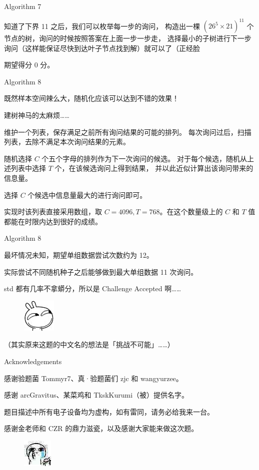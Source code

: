 \documentclass[UTF8]{beamer}
\begin{document}
\begin{frame}{Algorithm 7}

知道了下界 11 之后，我们可以枚举每一步的询问，%
构造出一棵 $(26^5 \times 21)^{11}$ 个节点的树，询问的时候按照答案在上面一步一步走，%
选择最小的子树进行下一步询问（这样能保证尽快到达叶子节点找到解）就可以了（正经脸 \newline\newline

\pause 期望得分 0 分。

\end{frame}

\begin{frame}{Algorithm 8}

既然样本空间辣么大，随机化应该可以达到不错的效果！

\pause
建树神马的太麻烦……

维护一个列表，保存满足之前所有询问结果的可能的排列。%
每次询问过后，扫描列表，去除不满足本次询问结果的元素。

\pause
随机选择 $C$ 个五个字母的排列作为下一次询问的候选。%
对于每个候选，随机从上述列表中选择 $T$ 个，在该候选询问上得到结果，%
并以此近似计算出该询问带来的信息量。

选择 $C$ 个候选中信息量最大的进行询问即可。

\pause
实现时该列表直接采用数组，取 $C = 4096, T = 768$。在这个数量级上的 %
$C$ 和 $T$ 值都能在时限内达到很好的成绩。

\end{frame}

\begin{frame}{Algorithm 8}

最坏情况未知，期望单组数据尝试次数约为 12。

实际尝试不同随机种子之后能够做到最大单组数据 11 次询问。

\pause
std 都有几率不拿蟒分，所以是 Challenge Accepted 啊……

\begin{figure}[h]\centering
\includegraphics[scale=0.5]{zz.jpg}
\end{figure}

（其实原来这题的中文名的想法是「挑战不可能」……）

\end{frame}

\begin{frame}{Acknowledgements}

感谢验题菌 Tommyr7、真·验题菌们 zjc 和 wangyurzee。

感谢 arcGravitus、某菜鸡和 TkskKurumi（被）提供名字。

题目描述中所有电子设备均为虚构，如有雷同，请务必给我来一台。

感谢金老师和 CZR 的鼎力滋瓷，以及感谢大家能来做这次题。

\begin{figure}[h]\centering
\includegraphics[scale=0.015]{ww.jpg}
\end{figure}

\end{frame}
\end{document}
